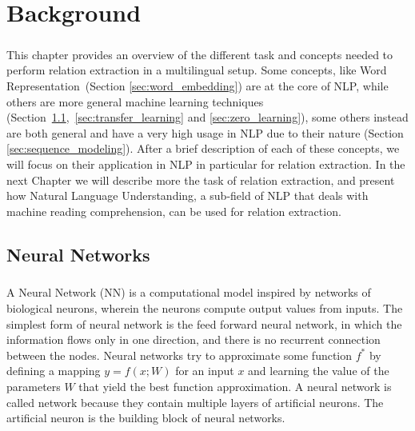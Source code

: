 \chapter{Background}
\label{chpt:2}
\paragraph{}
This chapter provides an overview of the different task and concepts needed to perform relation extraction in a multilingual setup. Some concepts, like Word Representation~(Section \ref{sec:word_embedding}) are at the core of NLP, while others are more general machine learning techniques (Section~\ref{sec:nn},~\ref{sec:transfer_learning} and \ref{sec:zero_learning}), some others instead are both general and have a very high usage in NLP due to their nature (Section \ref{sec:sequence_modeling}). After a brief description of each of these concepts, we will focus on their application in NLP in particular for relation extraction. In the next Chapter we will describe more the task of relation extraction, and present how Natural Language Understanding, a sub-field of NLP that deals with machine reading comprehension, can be used for relation extraction.


\section{Neural Networks}
\label{sec:nn}

\paragraph{}
A Neural Network (NN) is a computational model inspired by networks of biological neurons, wherein the neurons compute output values from inputs. The simplest form of neural network is the feed forward neural network, in which the information flows only in one direction, and there is no recurrent connection between the nodes. Neural networks try to approximate some function $f^{*}$ by defining a mapping $y = f(x; W)$ for an input $x$ and learning the value of the parameters $W$ that yield the best function approximation. A neural network is called network because they contain multiple layers of artificial neurons. The artificial neuron is the building block of neural networks.


